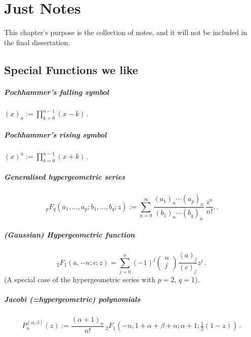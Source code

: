 \chapter*{Just Notes}
This chapter's purpose is the collection of notes, and it will not be included in the final dissertation.

\section*{Special Functions we like}

\paragraph{Pochhammer's falling symbol} $(x)_n := \prod_{k=0}^{n-1} (x-k)\,.$
\paragraph{Pochhammer's rising symbol} $(x)^n := \prod_{k=0}^{n-1} (x+k)\,.$

\paragraph{Generalised hypergeometric series}
$${ \,{}_{p}F_{q}(a_{1},\ldots ,a_{p};b_{1},\ldots ,b_{q};z) := \sum _{n=0}^{\infty }{\frac {(a_{1})_{n}\cdots (a_{p})_{n}}{(b_{1})_{n}\cdots (b_{q})_{n}}}\,{\frac {z^{n}}{n!}}.}\,.$$

\paragraph{(Gaussian) Hypergeometric function}
$${}_2 F_1(a,-n;c;z) = \sum_{j=0}^n (-1)^j \begin{pmatrix}n \\j\end{pmatrix} \frac{(a)_j}{(c)_j}z^j\,.$$
(A special case of the hypergeometric series with $p=2$, $q=1$).

\paragraph{Jacobi (=hypergeometric) polynomials}
$$P_{n}^{{(\alpha ,\beta )}}(z) := {\frac{(\alpha +1)_{n}}{n!}}\,{}_{2}F_{1}\left(-n,1+\alpha +\beta +n;\alpha +1;{\tfrac  {1}{2}}(1-z)\right)\,.$$

